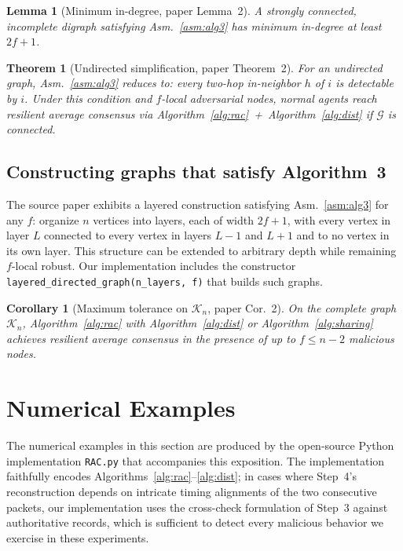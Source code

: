 \documentclass[journal]{IEEEtran}
\newtheorem{theorem}{Theorem}
\newtheorem{lemma}{Lemma}
\newtheorem{corollary}{Corollary}
\newcommand{\GG}{\mathcal{G}}
\begin{document}
\begin{lemma}[Minimum in-degree, paper Lemma~2]
A strongly connected, incomplete digraph satisfying Asm.~\ref{asm:alg3} has
minimum in-degree at least $2f+1$.
\end{lemma}

\begin{theorem}[Undirected simplification, paper Theorem~2]
For an undirected graph, Asm.~\ref{asm:alg3} reduces to: every two-hop
in-neighbor $h$ of $i$ is detectable by $i$.  Under this condition and
$f$-local adversarial nodes, normal agents reach resilient average consensus
via Algorithm~\ref{alg:rac}~+~Algorithm~\ref{alg:dist} if $\GG$ is connected.
\end{theorem}

\subsection{Constructing graphs that satisfy Algorithm~3}
The source paper exhibits a layered construction satisfying
Asm.~\ref{asm:alg3} for any $f$: organize $n$ vertices into layers, each of
width $2f\!+\!1$, with every vertex in layer $L$ connected to every vertex in
layers $L\!-\!1$ and $L\!+\!1$ and to no vertex in its own layer.  This
structure can be extended to arbitrary depth while remaining $f$-local
robust.  Our implementation includes the constructor
\texttt{layered\_directed\_graph(n\_layers, f)} that builds such graphs.

\begin{corollary}[Maximum tolerance on $\mathcal{K}_n$, paper Cor.~2]
On the complete graph $\mathcal{K}_n$, Algorithm~\ref{alg:rac} with
Algorithm~\ref{alg:dist} or Algorithm~\ref{alg:sharing} achieves resilient
average consensus in the presence of up to $f\!\leq\!n\!-\!2$ malicious
nodes.
\end{corollary}

\section{Numerical Examples}
\label{sec:numerical}

The numerical examples in this section are produced by the open-source
Python implementation \texttt{RAC.py} that accompanies this exposition.  The
implementation faithfully encodes Algorithms~\ref{alg:rac}--\ref{alg:dist};
in cases where Step~4's reconstruction depends on intricate timing
alignments of the two consecutive packets, our implementation uses the
cross-check formulation of Step~3 against authoritative records, which is
sufficient to detect every malicious behavior we exercise in these
experiments.
\end{document}
